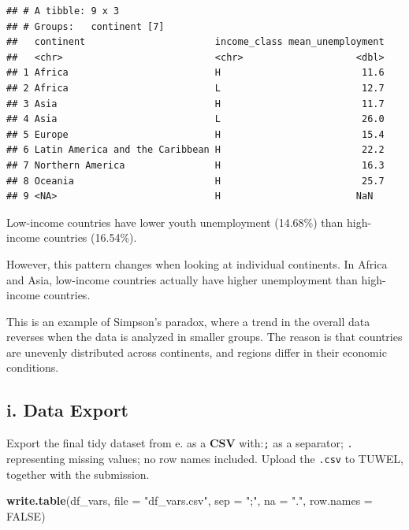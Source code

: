\documentclass[
]{article}
\newenvironment{Shaded}{\begin{snugshade}}{\end{snugshade}}
\newcommand{\AttributeTok}[1]{\textcolor[rgb]{0.13,0.29,0.53}{#1}}
\newcommand{\ConstantTok}[1]{\textcolor[rgb]{0.56,0.35,0.01}{#1}}
\newcommand{\FunctionTok}[1]{\textcolor[rgb]{0.13,0.29,0.53}{\textbf{#1}}}
\newcommand{\NormalTok}[1]{#1}
\newcommand{\StringTok}[1]{\textcolor[rgb]{0.31,0.60,0.02}{#1}}
\begin{document}
\begin{verbatim}
## # A tibble: 9 x 3
## # Groups:   continent [7]
##   continent                       income_class mean_unemployment
##   <chr>                           <chr>                    <dbl>
## 1 Africa                          H                         11.6
## 2 Africa                          L                         12.7
## 3 Asia                            H                         11.7
## 4 Asia                            L                         26.0
## 5 Europe                          H                         15.4
## 6 Latin America and the Caribbean H                         22.2
## 7 Northern America                H                         16.3
## 8 Oceania                         H                         25.7
## 9 <NA>                            H                        NaN
\end{verbatim}

Low-income countries have lower youth unemployment (14.68\%) than
high-income countries (16.54\%).

However, this pattern changes when looking at individual continents. In
Africa and Asia, low-income countries actually have higher unemployment
than high-income countries.

This is an example of Simpson's paradox, where a trend in the overall
data reverses when the data is analyzed in smaller groups. The reason is
that countries are unevenly distributed across continents, and regions
differ in their economic conditions.

\subsection{i. Data Export}\label{i.-data-export}

Export the final tidy dataset from e. as a \textbf{CSV} with:\texttt{;}
as a separator; \texttt{.} representing missing values; no row names
included. Upload the \texttt{.csv} to TUWEL, together with the
submission.

\begin{Shaded}
\begin{Highlighting}[]
\FunctionTok{write.table}\NormalTok{(df\_vars,}
            \AttributeTok{file =} \StringTok{"df\_vars.csv"}\NormalTok{,}
            \AttributeTok{sep =} \StringTok{";"}\NormalTok{,}
            \AttributeTok{na =} \StringTok{"."}\NormalTok{,}
            \AttributeTok{row.names =} \ConstantTok{FALSE}\NormalTok{)}
\end{Highlighting}
\end{Shaded}
\end{document}
